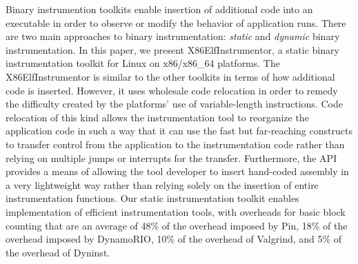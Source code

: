 \begin{it}

Binary instrumention toolkits enable insertion of additional code into an
executable in order to observe or modify the behavior of application runs. 
There are two main approaches to binary instrumentation: \textit{static} 
and \textit{dynamic} binary instrumentation. In this paper, we present X86ElfInstrumentor, 
a static binary instrumentation toolkit for Linux on x86/x86\_64 platforms. The X86ElfInstrumentor
is similar to the other toolkits in terms of how additional code is inserted. However, it uses wholesale
code relocation in order to remedy the difficulty created by the platforms' use
of variable-length instructions. Code relocation of this kind allows the
instrumentation tool to reorganize the application code in such a way that it
can use the fast but far-reaching constructs to transfer control
from the application to the instrumentation code rather than relying on multiple
jumps or interrupts for the transfer. Furthermore, the API provides a means of
allowing the tool developer to insert hand-coded assembly in a very lightweight
way rather than relying solely on the insertion of entire instrumentation functions.
Our static instrumentation toolkit enables implementation of efficient instrumentation tools, 
with overheads  for basic block counting that are an
average of 48\% of the overhead imposed by Pin, 18\% of the overhead imposed by
DynamoRIO, 10\% of the overhead of Valgrind, and 5\% of the overhead of Dyninst.
\end{it}
